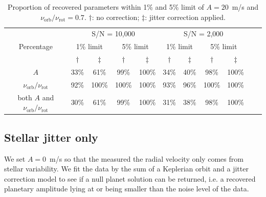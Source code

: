 \begin{table}[h!]
\centering
\begin{tabular}{|c|c|c|c|c|c|c|c|c|ll}
\cline{1-9}
\multirow{3}{*}{Percentage} & \multicolumn{4}{c|}{S/N = 10,000}                        & \multicolumn{4}{c|}{S/N = 2,000}                         &  &  \\ \cline{2-9}
                            & \multicolumn{2}{c|}{1\% limit} & \multicolumn{2}{c|}{5\% limit} & \multicolumn{2}{c|}{1\% limit} & \multicolumn{2}{c|}{5\% limit} &  &  \\ \cline{2-9}
                            				& $\dagger$     & $\ddagger$   & $\dagger$           & $\ddagger$           & $\dagger$           & $\ddagger$          & $\dagger$            & $\ddagger$          &  &  \\ \cline{1-9}
$A$                         					& 33\%            & 61\%           & 99\%            & 100\%            & 34\%            & 40\%           & 98\%             & 100\%           &  &  \\ \cline{1-9}
$\nu_\text{orb}/\nu_\text{rot}$              	& 92\%            & 100\%           & 100\%            & 100\%            & 93\%            & 96\%           & 100\%             & 100\%           &  &  \\ \cline{1-9}
both $A$ and $\nu_\text{orb}/\nu_\text{rot}$    & 30\%             & 61\%           & 99\%            & 100\%            & 31\%            & 38\%           & 98\%             & 100\%           &  &  \\ \cline{1-9}
\end{tabular}
\caption{Proportion of recovered parameters within 1\% and 5\% limit of $A = 20$~m/s and $\nu_\text{orb}/\nu_\text{rot} =0.7$. $\dagger$: no correction; $\ddagger$: jitter correction applied.}
\label{table:a=20}
\end{table}

\FloatBarrier

\subsection{Stellar jitter only}

We set $A=0$~m/s so that the measured the radial velocity only comes from stellar variability. We fit the data by the sum of a Keplerian orbit and a jitter correction model to see if a null planet solution can be returned, i.e. a recovered planetary amplitude lying at or being smaller than the noise level of the data.

